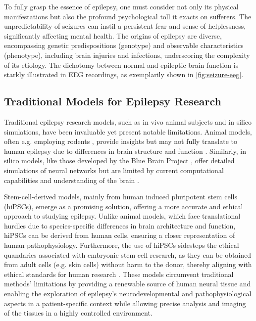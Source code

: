 \documentclass[10pt]{article}
\begin{document}
\begin{sloppypar}
  To fully grasp the essence of epilepsy, one must consider not only its physical manifestations but also the profound psychological toll it exacts on sufferers. The unpredictability of seizures can instil a persistent fear and sense of helplessness, significantly affecting mental health. The origins of epilepsy are diverse, encompassing genetic predispositions (genotype) and observable characteristics (phenotype), including brain injuries and infections, underscoring the complexity of its etiology.
  The dichotomy between normal and epileptic brain function is starkly illustrated in EEG recordings, as exemplarily shown in \autoref{fig:seizure-eeg}.

  \subsection{Traditional Models for Epilepsy Research}
  \label{sec:traditional-models-for-epilepsy-research}

  Traditional epilepsy research models, such as in vivo animal subjects and in silico simulations, have been invaluable yet present notable limitations. Animal models, often e.g. employing rodents \citep{wang_animal_2022}, provide insights but may not fully translate to human epilepsy due to differences in brain structure and function \citep{kandratavicius_animal_2014}. Similarly, in silico models, like those developed by the Blue Brain Project \citep{markram_blue_2006}, offer detailed simulations of neural networks but are limited by current computational capabilities and understanding of the brain \citep{mirza_integrative_2016}.

  Stem-cell-derived models, mainly from human induced pluripotent stem cells (hiPSCs), emerge as a promising solution, offering a more accurate and ethical approach to studying epilepsy. Unlike animal models, which face translational hurdles due to species-specific differences in brain architecture and function, hiPSCs can be derived from human cells, ensuring a closer representation of human pathophysiology. Furthermore, the use of hiPSCs sidesteps the ethical quandaries associated with embryonic stem cell research, as they can be obtained from adult cells (e.g. skin cells) without harm to the donor, thereby aligning with ethical standards for human research \citep{takahashi_induction_2006}. These models circumvent traditional methods’ limitations by providing a renewable source of human neural tissue and enabling the exploration of epilepsy’s neurodevelopmental and pathophysiological aspects in a patient-specific context while allowing precise analysis and imaging of the tissues in a highly controlled environment.


\end{sloppypar}
\end{document}
